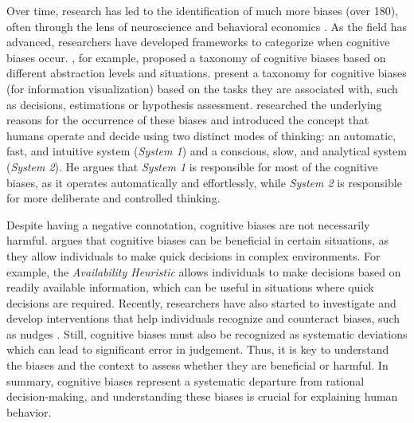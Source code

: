\par Over time, research has led to the identification of much more biases (over 180), often through the lens of neuroscience and behavioral economics \parencite{azzopardi2021cognitive}. As the field has advanced, researchers have developed frameworks to categorize when cognitive biases occur. \textcite{arnott1998taxonomy}, for example, proposed a taxonomy of cognitive biases based on different abstraction levels and situations. \textcite{dimara2018task} present a taxonomy for cognitive biases (for information visualization) based on the tasks they are associated with, such as decisions, estimations or hypothesis assessment. \textcite{kahneman2017thinking} researched the underlying reasons for the occurrence of these biases and introduced the concept that humans operate and decide using two distinct modes of thinking: an automatic, fast, and intuitive system (\textit{System 1}) and a conscious, slow, and analytical system (\textit{System 2}). He argues that \textit{System 1} is responsible for most of the cognitive biases, as it operates automatically and effortlessly, while \textit{System 2} is responsible for more deliberate and controlled thinking.

\par Despite having a negative connotation, cognitive biases are not necessarily harmful. \textcite{gigerenzer2007gut} argues that cognitive biases can be beneficial in certain situations, as they allow individuals to make quick decisions in complex environments. For example, the \textit{Availability Heuristic} allows individuals to make decisions based on readily available information, which can be useful in situations where quick decisions are required. Recently, researchers have also started to investigate and develop interventions that help individuals recognize and counteract biases, such as nudges \parencite{thaler2008nudge}. Still, cognitive biases must also be recognized as systematic deviations which can lead to significant error in judgement. Thus, it is key to understand the biases and the context to assess whether they are beneficial or harmful. In summary, cognitive biases represent a systematic departure from rational decision-making, and understanding these biases is crucial for explaining human behavior.


